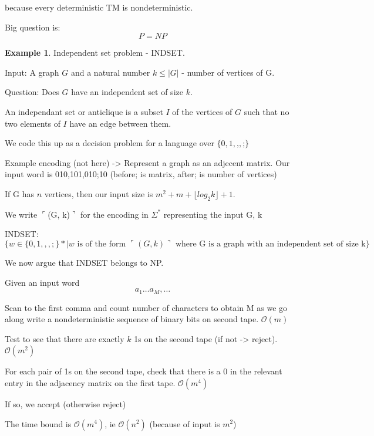 \documentclass[a4paper,12pt]{article}
\theoremstyle{definition}
\newtheorem{example}[counter]{Example}
\theoremstyle{remark}
\begin{document}
because every deterministic TM is nondeterministic.

Big question is:
\begin{equation*}
    P = NP
\end{equation*}

\begin{example}
    Independent set problem - INDSET.

    Input: A graph $G$ and a natural number $k \leq |G|$ - number of vertices of G.

    Question: Does $G$ have an independent set of size $k$.

    An independant set or anticlique is a subset $I$ of the vertices of $G$ such that no two elements of $I$ have an edge between them.

    We code this up as a decision problem for a language over $\{0, 1, \texttt{,}, \texttt{;}\}$

    Example encoding (not here) ->
    Represent a graph as an adjecent matrix.
    Our input word is 010,101,010;10 (before; is matrix, after; is number of vertices)

    If G has $n$ vertices, then our input size is $m^2 + m + \lfloor log_2 k \rfloor + 1$.

    We write $\ulcorner$(G, k)$\urcorner$ for the encoding in $\Sigma^*$ representing the input G, k

    INDSET:
    \begin{dmath*}
        \{w \in \{0, 1, ,, ;\}* | w \text{ is of the form } \ulcorner (G, k) \urcorner \text{ where G is a graph with an independent set of size k}\}
    \end{dmath*}

    We now argue that INDSET belongs to NP.

    Given an input word
    \begin{equation*}
        a_1 \dots a_M, \dots
    \end{equation*}

    Scan to the first comma and count number of characters to obtain M as we go along write a nondeterministic sequence of binary bits on second tape. $\mathscr{O}(m)$

    Test to see that there are exactly $k$ 1s on the second tape (if not -> reject). $\mathscr{O}(m^2)$

    For each pair of 1s on the second tape, check that there is a $0$ in the relevant entry in the adjacency matrix on the first tape. $\mathscr{O}(m^4)$

    If so, we accept (otherwise reject)

    The time bound is $\mathscr{O}(m^4)$, ie $\mathscr{O}(n^2)$ (because of input is $m^2$)
\end{example}
\end{document}
